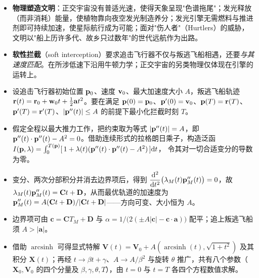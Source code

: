 \begin{keybox}[本章要点]
\begin{itemize}
  \item \textbf{物理塑造文明}：正交宇宙没有普适光速，使得天象呈现"色谱拖尾"；发光释放（而非消耗）能量，使植物靠向夜空发光制造养分；发光引擎无需燃料与推进剂即可持续加速，使星际航行成为可能；面对"伤人者"（Hurtlers）的威胁，文明以"船上历许多代、故乡只过数年"的世代远航作为出路。
  \item \textbf{软性拦截}（soft interception）要求追击飞行器不仅与叛逃飞船相遇，还要\emph{与其速度匹配}。在所涉低速下沿用牛顿力学；正交宇宙的另类物理仅体现在引擎的运转上。
  \item 设追击飞行器初始位置 $\mathbf{p}_0$、速度 $\mathbf{v}_0$、最大加速度大小 $A$，叛逃飞船轨迹 $\mathbf{r}(t)=\mathbf{r}_0+\mathbf{w}_0 t+\tfrac{1}{2}\mathbf{a}t^{2}$。要在满足 $\mathbf{p}(0)=\mathbf{p}_0$、$\mathbf{p}'(0)=\mathbf{v}_0$、$\mathbf{p}(T)=\mathbf{r}(T)$、$\mathbf{p}'(T)=\mathbf{r}'(T)$、$|\mathbf{p}''(t)|\le A$ 的前提下最小化拦截时刻 $T$。
  \item 假定全程以最大推力工作，把约束取为等式 $|\mathbf{p}''(t)|=A$，即 $\mathbf{p}''(t)\cdot\mathbf{p}''(t)-A^{2}=0$。借助连续形式的拉格朗日乘子，构造泛函
        $I(\mathbf{p},\lambda)=\int_{0}^{T(\mathbf{p})}[\,1+\lambda(t)(\mathbf{p}''(t)\cdot\mathbf{p}''(t)-A^{2})\,]\mathrm{d} t$，
        令其对一切合适变分的导数为零。
  \item 变分、两次分部积分并消去边界项后，得到 $\dfrac{\mathrm{d}^{2}}{\mathrm{d} t^{2}}\bigl(\lambda_M(t)\mathbf{p}_M''(t)\bigr)=0$，故 $\lambda_M(t)\mathbf{p}_M''(t)=\mathbf{C}t+\mathbf{D}$，从而最优轨道的加速度为
        $\mathbf{p}_M''(t)=A(\mathbf{C}t+\mathbf{D})/|\mathbf{C}t+\mathbf{D}|$——方向可变、大小恒为 $A$。
  \item 边界项可由 $\mathbf{c}=\mathbf{C}T_M+\mathbf{D}$ 与 $\alpha=1/\bigl(2(\pm A|\mathbf{c}|-\mathbf{c}\cdot\mathbf{a})\bigr)$ 配平；追上叛逃飞船须 $A>|\mathbf{a}|$。
  \item 借助 $\operatorname{arcsinh}$ 可得显式特解 $\mathbf{V}(t)=\mathbf{V}_0+A(\operatorname{arcsinh}(t),\sqrt{1+t^{2}})$ 及其积分 $\mathbf{X}(t)$；再经 $t\to\beta t+\gamma$、$A\to A/\beta^{2}$ 与旋转 $\theta$ 推广，共有八个参数（$\mathbf{X}_0,\mathbf{V}_0$ 的四个分量及 $\beta,\gamma,\theta,T$），由 $t=0$ 与 $t=T$ 各四个方程数值求解。
\end{itemize}
\end{keybox}
